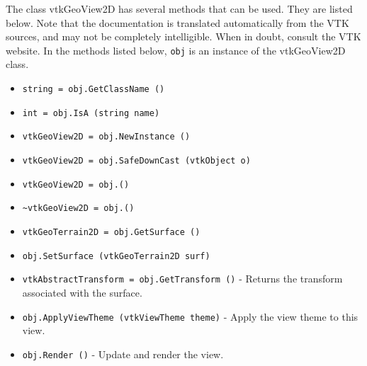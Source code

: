 The class vtkGeoView2D has several methods that can be used.
  They are listed below.
Note that the documentation is translated automatically from the VTK sources,
and may not be completely intelligible.  When in doubt, consult the VTK website.
In the methods listed below, \verb|obj| is an instance of the vtkGeoView2D class.
\begin{itemize}
\item  \verb|string = obj.GetClassName ()|

\item  \verb|int = obj.IsA (string name)|

\item  \verb|vtkGeoView2D = obj.NewInstance ()|

\item  \verb|vtkGeoView2D = obj.SafeDownCast (vtkObject o)|

\item  \verb|vtkGeoView2D = obj.()|

\item  \verb|~vtkGeoView2D = obj.()|

\item  \verb|vtkGeoTerrain2D = obj.GetSurface ()|

\item  \verb|obj.SetSurface (vtkGeoTerrain2D surf)|

\item  \verb|vtkAbstractTransform = obj.GetTransform ()| -  Returns the transform associated with the surface.

\item  \verb|obj.ApplyViewTheme (vtkViewTheme theme)| -  Apply the view theme to this view.

\item  \verb|obj.Render ()| -  Update and render the view.

\end{itemize}
